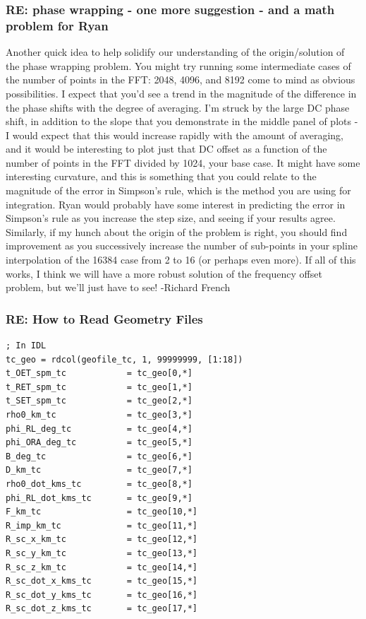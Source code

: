\documentclass[crop=false,class=article,oneside]{standalone}
\begin{document}
\subsubsection{\footnotesize RE: phase wrapping - one more suggestion - and a math problem for Ryan}
Another quick idea to help solidify our understanding of the origin/solution of the phase wrapping problem. You might try running some intermediate cases of the number of points in the FFT: 2048, 4096, and 8192 come to mind as obvious possibilities. I expect that you'd see a trend in the magnitude of the difference in the phase shifts with the degree of averaging. I'm struck by the large DC phase shift, in addition to the slope that you demonstrate in the middle panel of plots - I would expect that this would increase rapidly with the amount of averaging, and it would be interesting to plot just that DC offset as a function of the number of points in the FFT divided by 1024, your base case. It might have some interesting curvature, and this is something that you could relate to the magnitude of the error in Simpson's rule, which is the method you are using for integration. Ryan would probably have some interest in predicting the error in Simpson's rule as you increase the step size, and seeing if your results agree. Similarly, if my hunch about the origin of the problem is right, you should find improvement as you successively increase the number of sub-points in your spline interpolation of the 16384 case from 2 to 16 (or perhaps even more). If all of this works, I think we will have a more robust solution of the frequency offset problem, but we'll just have to see! -Richard French
\subsubsection{\footnotesize RE: How to Read Geometry Files}
\begin{lstlisting}[language=IDL]
; In IDL
tc_geo = rdcol(geofile_tc, 1, 99999999, [1:18])
t_OET_spm_tc            = tc_geo[0,*]
t_RET_spm_tc            = tc_geo[1,*]
t_SET_spm_tc            = tc_geo[2,*]
rho0_km_tc              = tc_geo[3,*]
phi_RL_deg_tc           = tc_geo[4,*]
phi_ORA_deg_tc          = tc_geo[5,*]
B_deg_tc                = tc_geo[6,*]
D_km_tc                 = tc_geo[7,*]
rho0_dot_kms_tc         = tc_geo[8,*]
phi_RL_dot_kms_tc       = tc_geo[9,*]
F_km_tc                 = tc_geo[10,*]
R_imp_km_tc             = tc_geo[11,*]
R_sc_x_km_tc            = tc_geo[12,*]
R_sc_y_km_tc            = tc_geo[13,*]
R_sc_z_km_tc            = tc_geo[14,*]
R_sc_dot_x_kms_tc       = tc_geo[15,*]
R_sc_dot_y_kms_tc       = tc_geo[16,*]
R_sc_dot_z_kms_tc       = tc_geo[17,*]
\end{lstlisting}
\end{document}
